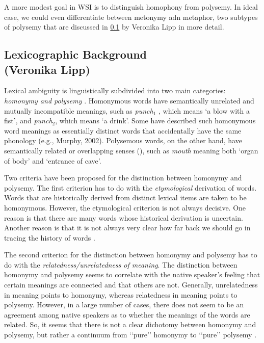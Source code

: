 \documentclass[11pt]{article}
\begin{document}
A more modest goal in WSI is to distinguish homophony from polysemy. In ideal
case, we could even differentiate between metonymy adn metaphor, two subtypes
of polysemy that are discussed in \cref{sec:bground} by Veronika Lipp in more
detail.

\pagebreak

\subsection{Lexicographic Background \\ (Veronika Lipp)}

\label{sec:bground}

Lexical ambiguity is linguistically subdivided into two main categories:
\emph{homonymy and polysemy} \citep{Cruse:2004}. Homonymous words have
semantically unrelated and mutually incompatible meanings, such as
\emph{punch$_1$} , which means `a blow with a fist', and \emph{punch$_2$},
which means `a drink'. Some have described such homonymous word meanings as
essentially distinct words that accidentally have the same phonology (e.g.,
Murphy, 2002). Polysemous words, on the other hand, have semantically related
or overlapping senses (\cite{Cruse:2004,Jackendoff:2002, Pustejovsky:1995}),
such as \emph{mouth} meaning both `organ of body' and `entrance of cave'.

Two criteria have been proposed for the distinction between homonymy and
polysemy. The first criterion has to do with the \emph{etymological} derivation
of words. Words that are historically derived from distinct lexical items are
taken to be homonymous. However, the etymological criterion is not always
decisive. One reason is that there are many words whose historical derivation
is uncertain. Another reason is that it is not always very clear how far back
we should go in tracing the history of words \citep{Lyons:1977}.

The second criterion for the distinction between homonymy and polysemy has to
do with the \emph{relatedness/unrelatedness of meaning}.  The distinction
between homonymy and polysemy seems to correlate with the native speaker’s
feeling that certain meanings are connected and that others are not. Generally,
unrelatedness in meaning points to homonymy, whereas relatedness in meaning
points to polysemy.  However, in a large number of cases, there does not seem
to be an agreement among native speakers as to whether the meanings of the
words are related. So, it seems that there is not a clear dichotomy between
homonymy and polysemy, but rather a continuum from ‘‘pure’’ homonymy to
‘‘pure’’ polysemy \citep{Lyons:1977}.
\end{document}
